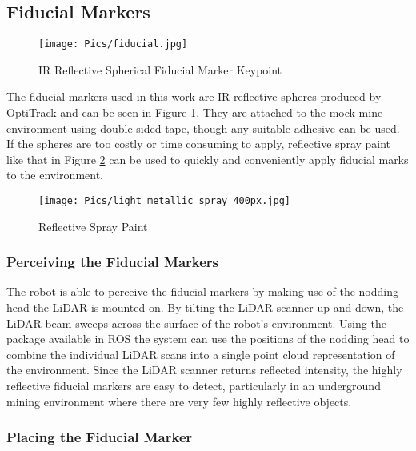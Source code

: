 \subsection{Fiducial Markers}

\begin{figure}
    \centering
    \texttt{[image: Pics/fiducial.jpg]}
    \caption{IR Reflective Spherical Fiducial Marker Keypoint}
    \label{fig:fiducial}
\end{figure}

The fiducial markers used in this work are IR reflective spheres produced by OptiTrack and can be seen in Figure \ref{fig:fiducial}. They are attached to the mock mine environment using double sided tape, though any suitable adhesive can be used. If the spheres are too costly or time consuming to apply, reflective spray paint like that in Figure \ref{fig:irspray} can be used to quickly and conveniently apply fiducial marks to the environment.\\

\begin{figure}
    \centering
    \texttt{[image: Pics/light\_metallic\_spray\_400px.jpg]}
    \caption{Reflective Spray Paint \cite{spraypaint}}
    \label{fig:irspray}
\end{figure}

\subsubsection{Perceiving the Fiducial Markers}

The robot is able to perceive the fiducial markers by making use of the nodding head the LiDAR is mounted on. By tilting the LiDAR scanner up and down, the LiDAR beam sweeps across the surface of the robot's environment. Using the  package available in ROS the system can use the positions of the nodding head to combine the individual LiDAR scans into a single point cloud representation of the environment. Since the LiDAR scanner returns reflected intensity, the highly reflective fiducial markers are easy to detect, particularly in an underground mining environment where there are very few highly reflective objects.\\

\subsubsection{Placing the Fiducial Marker}

